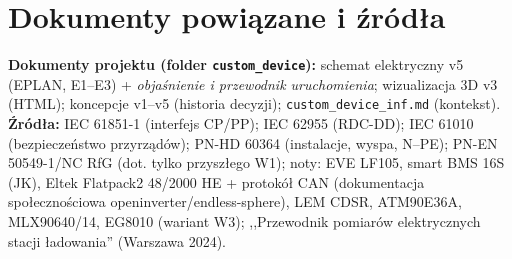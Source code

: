 \documentclass[11pt,a4paper]{article}
\begin{document}
\section{Dokumenty powiązane i źródła}
\textbf{Dokumenty projektu (folder \texttt{custom\_device}):} schemat elektryczny v5 (EPLAN,
E1--E3) + \emph{objaśnienie i przewodnik uruchomienia}; wizualizacja 3D v3 (HTML); koncepcje
v1--v5 (historia decyzji); \texttt{custom\_device\_inf.md} (kontekst).
\textbf{Źródła:} IEC 61851-1 (interfejs CP/PP); IEC 62955 (RDC-DD); IEC 61010 (bezpieczeństwo
przyrządów); PN-HD 60364 (instalacje, wyspa, N--PE); PN-EN 50549-1/NC RfG (dot. tylko przyszłego
W1); noty: EVE LF105, smart BMS 16S (JK), Eltek Flatpack2 48/2000 HE + protokół CAN (dokumentacja
społecznościowa openinverter/endless-sphere), LEM CDSR, ATM90E36A, MLX90640/14, EG8010 (wariant W3);
,,Przewodnik pomiarów elektrycznych stacji ładowania'' (Warszawa 2024).
\end{document}
